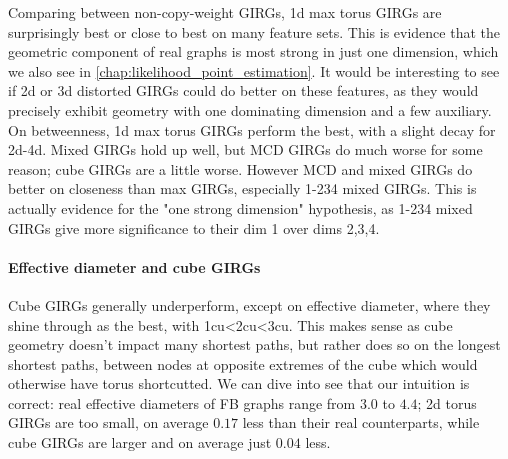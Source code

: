 Comparing between non-copy-weight GIRGs, 1d max torus GIRGs are surprisingly best or close to best on many feature sets. This is evidence that the geometric component of real graphs is most strong in just one dimension, which we also see in \cref{chap:likelihood_point_estimation}. It would be interesting to see if 2d or 3d distorted GIRGs could do better on these features, as they would precisely exhibit geometry with one dominating dimension and a few auxiliary.
On betweenness, 1d max torus GIRGs perform the best, with a slight decay for 2d-4d. Mixed GIRGs hold up well, but MCD GIRGs do much worse for some reason; cube GIRGs are a little worse.
However MCD and mixed GIRGs do better on closeness than max GIRGs, especially 1-234 mixed GIRGs. This is actually evidence for the "one strong dimension" hypothesis, as 1-234 mixed GIRGs give more significance to their dim 1 over dims 2,3,4.  

\paragraph{Effective diameter and cube GIRGs}
Cube GIRGs generally underperform, except on effective diameter, where they shine through as the best, with 1cu\textless 2cu\textless 3cu. This makes sense as cube geometry doesn't impact many shortest paths, but rather does so on the longest shortest paths, between nodes at opposite extremes of the cube which would otherwise have torus shortcutted. We can dive into see that our intuition is correct: real effective diameters of FB graphs range from $3.0$ to $4.4$; 2d torus GIRGs are too small, on average $0.17$ less than their real counterparts, while cube GIRGs are larger and on average just $0.04$ less.





